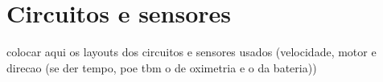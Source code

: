 \section{Circuitos e sensores}
colocar aqui os layouts dos circuitos e sensores usados (velocidade, motor e direcao (se der tempo, poe tbm o de oximetria e o da bateria))